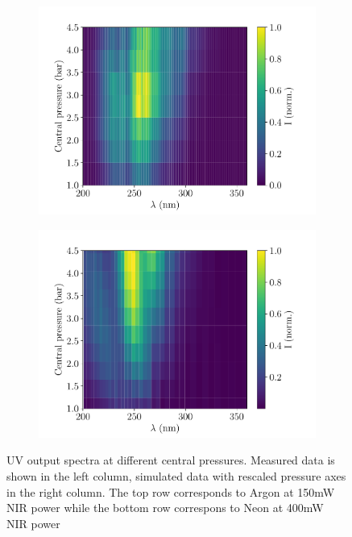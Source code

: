\documentclass[a4paper]{jpconf}
\begin{document}
\begin{figure}[h]
\begin{subfigure}{0.49\textwidth}
        \includegraphics[width=\textwidth]{im/2d_spectra_pres_Ne_400mW_meas}
    \caption{}
    \end{subfigure}
    \begin{subfigure}{0.49\textwidth}
        \includegraphics[width=\textwidth]{im/2d_spectra_pres_Ne_400mW_2.5scaled_grad}
    \caption{}
    \end{subfigure}  
\caption{UV output spectra at different central pressures. Measured data is shown in the left column, simulated data with rescaled pressure axes in the right column. The top row corresponds to Argon at 150mW NIR power while the bottom row correspons to Neon at 400mW NIR power}\label{im:spec_2d}
\end{figure}
\end{document}
